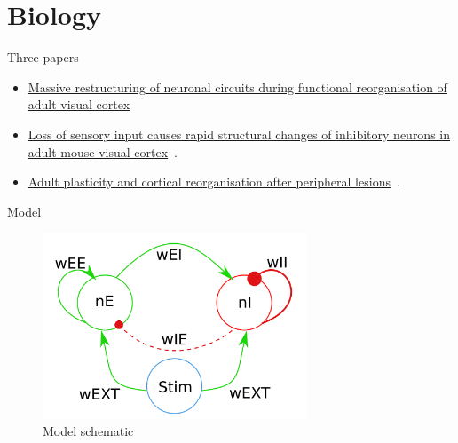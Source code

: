 \section{Biology}
\begin{frame}{Three papers}
  \begin{itemize}
    \item \href{http://www.nature.com/neuro/journal/v11/n10/abs/nn.2181.html}{Massive restructuring of neuronal circuits during functional reorganisation of adult visual cortex}~\cite{Keck.517}
      \pause
    \item \href{http://www.sciencedirect.com/science/article/pii/S0896627311005642}{Loss of sensory input causes rapid structural changes of inhibitory neurons in adult mouse visual cortex}~\cite{Keck2011869}.
      \pause
    \item \href{http://www.sciencedirect.com/science/article/pii/S0959438815001312}{Adult plasticity and cortical reorganisation after peripheral lesions}~\cite{Sammons2015136}.
  \end{itemize}
\end{frame}
\begin{frame}{Model}
  \begin{figure}
    \includegraphics[keepaspectratio,width=0.7\textwidth]{99_images/model-schematic}
    \caption{Model schematic}
  \end{figure}
\end{frame}
